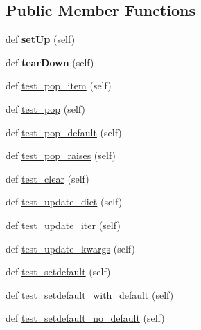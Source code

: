 \subsection*{Public Member Functions}
\begin{DoxyCompactItemize}
\item 
\mbox{\label{classh5py__LOCAL_1_1tests_1_1old_1_1test__group_1_1TestAdditionalMappingFuncs_a3aa81711083fd0b6832c4c2c94713d95}} 
def {\bfseries set\+Up} (self)
\item 
\mbox{\label{classh5py__LOCAL_1_1tests_1_1old_1_1test__group_1_1TestAdditionalMappingFuncs_abb270397dd7263a616d7de9b494d4e96}} 
def {\bfseries tear\+Down} (self)
\item 
def \hyperlink{classh5py__LOCAL_1_1tests_1_1old_1_1test__group_1_1TestAdditionalMappingFuncs_a867767b34906a87437e4449829939e78}{test\+\_\+pop\+\_\+item} (self)
\item 
def \hyperlink{classh5py__LOCAL_1_1tests_1_1old_1_1test__group_1_1TestAdditionalMappingFuncs_ae62e622c0ea37abca1d3795ed8efe0fd}{test\+\_\+pop} (self)
\item 
def \hyperlink{classh5py__LOCAL_1_1tests_1_1old_1_1test__group_1_1TestAdditionalMappingFuncs_a1c18de6edadd721b535affef51653a50}{test\+\_\+pop\+\_\+default} (self)
\item 
def \hyperlink{classh5py__LOCAL_1_1tests_1_1old_1_1test__group_1_1TestAdditionalMappingFuncs_ab45a073fd0aeaf6596b3a4909756eb38}{test\+\_\+pop\+\_\+raises} (self)
\item 
def \hyperlink{classh5py__LOCAL_1_1tests_1_1old_1_1test__group_1_1TestAdditionalMappingFuncs_a2516140aed9712e98e0febe1b173a6fe}{test\+\_\+clear} (self)
\item 
def \hyperlink{classh5py__LOCAL_1_1tests_1_1old_1_1test__group_1_1TestAdditionalMappingFuncs_ab5dc7563bdd7b4e41463512f33cef2c5}{test\+\_\+update\+\_\+dict} (self)
\item 
def \hyperlink{classh5py__LOCAL_1_1tests_1_1old_1_1test__group_1_1TestAdditionalMappingFuncs_a003fa16d615c081c8a10fd1a068080ef}{test\+\_\+update\+\_\+iter} (self)
\item 
def \hyperlink{classh5py__LOCAL_1_1tests_1_1old_1_1test__group_1_1TestAdditionalMappingFuncs_a7517a3254128d972d23109b3793871c0}{test\+\_\+update\+\_\+kwargs} (self)
\item 
def \hyperlink{classh5py__LOCAL_1_1tests_1_1old_1_1test__group_1_1TestAdditionalMappingFuncs_ad1483876797dfdee51bec69b994ffeb3}{test\+\_\+setdefault} (self)
\item 
def \hyperlink{classh5py__LOCAL_1_1tests_1_1old_1_1test__group_1_1TestAdditionalMappingFuncs_ad25e61d805d77633dfe2430f41489a6e}{test\+\_\+setdefault\+\_\+with\+\_\+default} (self)
\item 
def \hyperlink{classh5py__LOCAL_1_1tests_1_1old_1_1test__group_1_1TestAdditionalMappingFuncs_a739a9b6bd3f1218f62a89a493ea2a599}{test\+\_\+setdefault\+\_\+no\+\_\+default} (self)
\end{DoxyCompactItemize}
